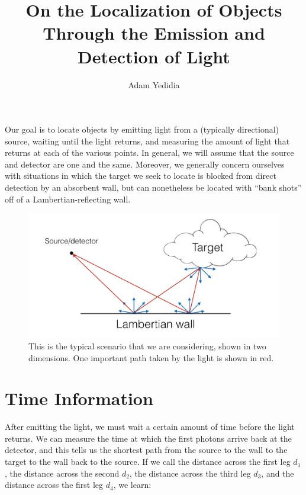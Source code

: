 \documentclass[11pt]{article}
\title{On the Localization of Objects Through the Emission and Detection of Light}
\author{Adam Yedidia}
\begin{document}
    
\maketitle

Our goal is to locate objects by emitting light from a (typically directional) source, waiting until the light returns, and measuring the amount of light that returns at each of the various points. In general, we will assume that the source and detector are one and the same. Moreover, we generally concern ourselves with situations in which the target we seek to locate is blocked from direct detection by an absorbent wall, but can nonetheless be located with ``bank shots'' off of a Lambertian-reflecting wall.

\begin{figure} 
\begin{center} 
\includegraphics[scale=0.4]{typical_scenario.png} 
\caption{This is the typical scenario that we are considering, shown in two dimensions. One important path taken by the light is shown in red.} 
\end{center} 
\end{figure}

\section{Time Information}

After emitting the light, we must wait a certain amount of time before the light returns. We can measure the time at which the first photons arrive back at the detector, and this tells us the shortest path from the source to the wall to the target to the wall back to the source. If we call the distance across the first leg $d_1$, the distance across the second $d_2$, the distance across the third leg $d_3$, and the distance across the first leg $d_4$, we learn:
\end{document}
